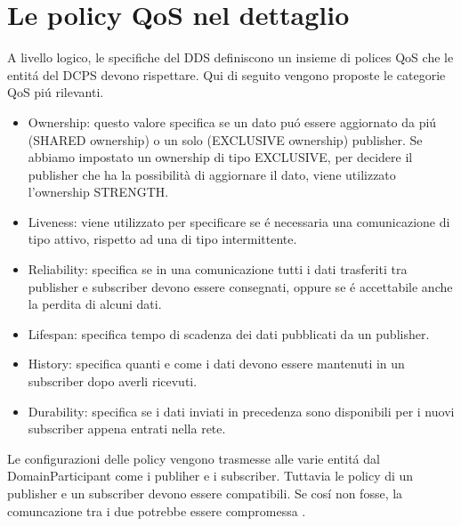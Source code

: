 \section{Le policy QoS nel dettaglio}
A livello logico, le specifiche del DDS
definiscono un insieme di polices QoS
che le entitá del DCPS devono rispettare. Qui di seguito vengono
proposte le categorie QoS piú rilevanti.
\begin{itemize}
    \item Ownership: questo valore specifica se un dato
    puó essere aggiornato da piú 
    (SHARED ownership) o un solo (EXCLUSIVE ownership) publisher.
    Se abbiamo impostato un ownership di tipo EXCLUSIVE, per decidere il 
    publisher che ha la possibilità di aggiornare il dato, viene 
    utilizzato l'ownership STRENGTH.
    \item Liveness: viene utilizzato per specificare se é necessaria
    una comunicazione di tipo attivo, rispetto ad una di tipo 
    intermittente.
    \item Reliability: specifica se in una comunicazione tutti i dati
    trasferiti tra publisher e subscriber devono essere consegnati, oppure
    se é accettabile anche la perdita di alcuni dati.
    \item Lifespan: specifica tempo di scadenza dei dati pubblicati da 
    un publisher.
    \item History: specifica quanti e come i dati devono essere 
    mantenuti in un 
    subscriber dopo averli ricevuti.
    \item Durability: specifica se i dati inviati in precedenza sono
    disponibili per i nuovi subscriber appena entrati nella rete.
\end{itemize}
Le configurazioni 
delle policy vengono trasmesse alle varie entitá dal DomainParticipant
come i publiher e i subscriber.
Tuttavia le policy di un publisher e un subscriber devono essere compatibili.
Se cosí non fosse, la comuncazione tra i due potrebbe essere compromessa
\cite{Michaud2017Apr}.


